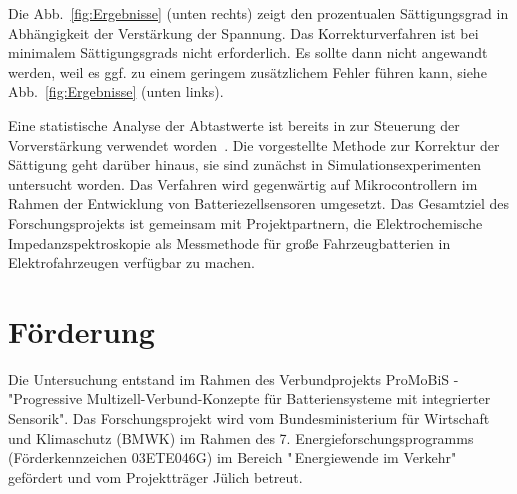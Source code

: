 \smallskip
Die Abb.~\ref{fig:Ergebnisse} (unten rechts) zeigt den prozentualen Sättigungsgrad in Abhängigkeit der Verstärkung der Spannung. Das Korrekturverfahren ist bei minimalem Sättigungsgrads nicht erforderlich. Es sollte dann nicht angewandt werden, weil es ggf. zu einem geringem zusätzlichem Fehler führen kann, siehe Abb.~\ref{fig:Ergebnisse} (unten links). 

Eine statistische Analyse der Abtastwerte ist bereits in zur Steuerung der Vorverstärkung verwendet worden~\cite{Frahm-2023}. Die vorgestellte Methode zur Korrektur der Sättigung geht darüber hinaus, sie sind zunächst in Simulationsexperimenten untersucht worden. Das Verfahren wird gegenwärtig auf Mikrocontrollern im Rahmen der Entwicklung von Batteriezellsensoren umgesetzt. Das Gesamtziel des Forschungsprojekts ist gemeinsam mit Projektpartnern, die Elektrochemische Impedanzspektroskopie als Messmethode für große Fahrzeugbatterien in Elektrofahrzeugen verfügbar zu machen.

\section*{Förderung}
Die Untersuchung entstand im Rahmen des Verbundprojekts ProMoBiS - "Progressive Multizell-Verbund-Konzepte für Batteriensysteme mit integrierter Sensorik". Das Forschungsprojekt wird vom Bundesministerium für Wirtschaft und Klimaschutz (BMWK) im Rahmen des 7. Energieforschungsprogramms (Förderkennzeichen 03ETE046G) im Bereich "\,Energiewende im Verkehr"\,gefördert und vom Projektträger Jülich betreut.
   

